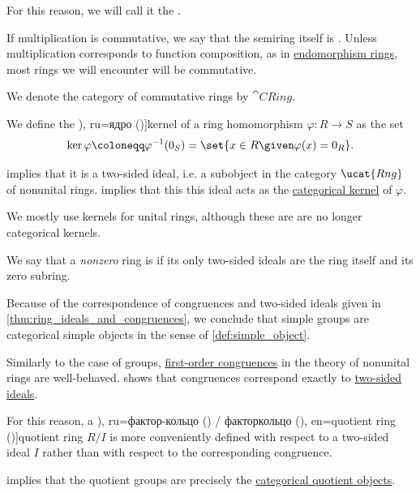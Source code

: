 \begin{definition}
\begin{thmenum}
    For this reason, we will call it the .

     If multiplication is commutative, we say that the semiring itself is . Unless multiplication corresponds to function composition, as in \hyperref[def:endomorphism_ring]{endomorphism rings}, most rings we will encounter will be commutative.

    We denote the category of commutative rings by \( \cat{CRing} \).

     We define the \term[bg=ядро (\cite[123]{ГеновМиховскиМоллов1991Алгебра}), ru=ядро (\cite[156]{Кострикин2020АлгебраЧасть1})]{kernel} of a ring homomorphism \( \varphi: R \to S \) as the set
    \begin{equation}\label{eq:def:ring/kernel}
      \ker \varphi \coloneqq \varphi^{-1}(0_S) = \set{ x \in R \given \varphi(x) = 0_R }.
    \end{equation}

     implies that it is a two-sided ideal, i.e. a subobject in the category \( \ucat{Rng} \) of nonunital rings.  implies that this this ideal acts as the \hyperref[def:categorical_kernels/kernel]{categorical kernel} of \( \varphi \).

    We mostly use kernels for unital rings, although these are are no longer categorical kernels.

     We say that a \emph{nonzero} ring is  if its only two-sided ideals are the ring itself and its zero subring.

    Because of the correspondence of congruences and two-sided ideals given in \cref{thm:ring_ideals_and_congruences}, we conclude that simple groups are categorical simple objects in the sense of \cref{def:simple_object}.

    \mimprovised Similarly to the case of groups, \hyperref[def:fol_congruence]{first-order congruences} in the theory of nonunital rings are well-behaved.  shows that congruences correspond exactly to \hyperref[def:semiring_ideal]{two-sided ideals}.

    For this reason, a \term[bg=фактор-пръстен (\cite[121]{ГеновМиховскиМоллов1991Алгебра}), ru=фактор-кольцо (\cite[337]{Тыртышников2017ОсновыАлгебры}) / факторкольцо (\cite[387]{Винберг2014КурсАлгебры}), en=quotient ring (\cite[101]{Jacobson1985BasicAlgebraI})]{quotient ring} \( R / I \) is more conveniently defined with respect to a two-sided ideal \( I \) rather than with respect to the corresponding congruence.

     implies that the quotient groups are precisely the \hyperref[def:categorical_quotient_object]{categorical quotient objects}.
  \end{thmenum}
\end{definition}

